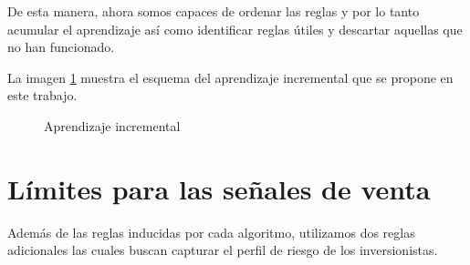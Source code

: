 \documentclass[12pt]{scrbook}
\theoremstyle{break}
\theoremstyle{break}
\begin{document}
De esta manera, ahora somos capaces de ordenar las reglas y por lo tanto acumular el aprendizaje así como identificar reglas útiles y descartar aquellas que no han funcionado.

La imagen \ref{imagen:aprendizaje_incremental} muestra el esquema del aprendizaje incremental que se propone en este trabajo.


\begin{figure}[ht]
\centering
{}
\caption{\label{imagen:aprendizaje_incremental} Aprendizaje incremental}
\end{figure}


\section{Límites para las señales de venta}
\label{seccion:limites ventas}
Además de las reglas inducidas por cada algoritmo, utilizamos dos reglas adicionales las cuales buscan capturar el perfil de riesgo de los inversionistas.
\end{document}
